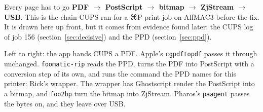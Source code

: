 \documentclass[11pt,a4paper]{article}
\begin{document}
Every page has to go \textbf{PDF $\rightarrow$ PostScript $\rightarrow$ bitmap $\rightarrow$ ZjStream $\rightarrow$ USB}. This is the chain CUPS ran for a ⌘P print job on AlfMAC3 before the fix. It is drawn here up front, but it comes from evidence found later: the CUPS log of job 156 (section~\ref{sec:decisive}) and the PPD (section~\ref{sec:ppd}).

Left to right: the app hands CUPS a PDF. Apple's \texttt{cgpdftopdf} passes it through unchanged. \texttt{foomatic-rip} reads the PPD, turns the PDF into PostScript with a conversion step of its own, and runs the command the PPD names for this printer: Rick's wrapper. The wrapper has Ghostscript render the PostScript into a bitmap, and \texttt{foo2hp} turn the bitmap into ZjStream. Pharos's \texttt{paagent} passes the bytes on, and they leave over USB.

\begin{center}
\end{center}
\end{document}
